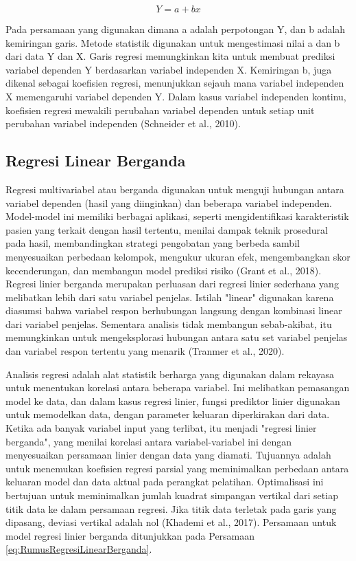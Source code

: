 \begin{equation}
  \label{eq:RumusRegresiLinearSederhana}
  Y = a + bx
\end{equation}

Pada persamaan yang digunakan dimana a adalah perpotongan Y, dan b adalah kemiringan garis. Metode statistik digunakan untuk mengestimasi nilai a dan b dari data Y dan X. Garis regresi memungkinkan kita untuk membuat prediksi variabel dependen Y berdasarkan variabel independen X. Kemiringan b, juga dikenal sebagai koefisien regresi, menunjukkan sejauh mana variabel independen X memengaruhi variabel dependen Y. Dalam kasus variabel independen kontinu, koefisien regresi mewakili perubahan variabel dependen untuk setiap unit perubahan variabel independen (Schneider et al., 2010).

\subsection{Regresi Linear Berganda}
\label{subsec:regresilinearberganda}

Regresi multivariabel atau berganda digunakan untuk menguji hubungan antara variabel dependen (hasil yang diinginkan) dan beberapa variabel independen. Model-model ini memiliki berbagai aplikasi, seperti mengidentifikasi karakteristik pasien yang terkait dengan hasil tertentu, menilai dampak teknik prosedural pada hasil, membandingkan strategi pengobatan yang berbeda sambil menyesuaikan perbedaan kelompok, mengukur ukuran efek, mengembangkan skor kecenderungan, dan membangun model prediksi risiko (Grant et al., 2018). Regresi linier berganda merupakan perluasan dari regresi linier sederhana yang melibatkan lebih dari satu variabel penjelas. Istilah "linear" digunakan karena diasumsi bahwa variabel respon berhubungan langsung dengan kombinasi linear dari variabel penjelas. Sementara analisis tidak membangun sebab-akibat, itu memungkinkan untuk mengeksplorasi hubungan antara satu set variabel penjelas dan variabel respon tertentu yang menarik (Tranmer et al., 2020).

Analisis regresi adalah alat statistik berharga yang digunakan dalam rekayasa untuk menentukan korelasi antara beberapa variabel. Ini melibatkan pemasangan model ke data, dan dalam kasus regresi linier, fungsi prediktor linier digunakan untuk memodelkan data, dengan parameter keluaran diperkirakan dari data. Ketika ada banyak variabel input yang terlibat, itu menjadi "regresi linier berganda", yang menilai korelasi antara variabel-variabel ini dengan menyesuaikan persamaan linier dengan data yang diamati. Tujuannya adalah untuk menemukan koefisien regresi parsial yang meminimalkan perbedaan antara keluaran model dan data aktual pada perangkat pelatihan. Optimalisasi ini bertujuan untuk meminimalkan jumlah kuadrat simpangan vertikal dari setiap titik data ke dalam persamaan regresi. Jika titik data terletak pada garis yang dipasang, deviasi vertikal adalah nol (Khademi et al., 2017). Persamaan untuk model regresi linier berganda ditunjukkan pada Persamaan \ref{eq:RumusRegresiLinearBerganda}.

